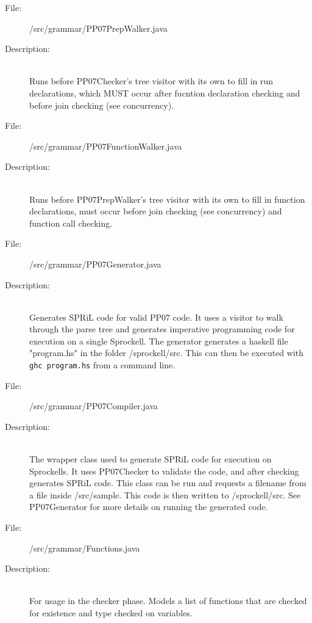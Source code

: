 \documentclass[10pt,a4paper]{report}
\begin{document}
\begin{description}
	\item[File:] /src/grammar/PP07PrepWalker.java
	\item[Description:] \hfill \\
		Runs before PP07Checker's tree visitor with its own to fill in run declarations, which MUST occur after fucntion declaration checking and before join checking (see concurrency). 
\end{description}

\begin{description}
	\item[File:] /src/grammar/PP07FunctionWalker.java
	\item[Description:] \hfill \\
		Runs before PP07PrepWalker's tree visitor with its own to fill in function declarations, must occur before join checking (see concurrency) and function call checking. 
\end{description}

\begin{description}
	\item[File:] /src/grammar/PP07Generator.java
	\item[Description:] \hfill \\
		Generates SPRiL code for valid PP07 code. It uses a visitor to walk through the parse tree and generates imperative programming code for execution on a single Sprockell. The generator generates a haskell file "program.hs" in the folder /sprockell/src. This can then be executed with \texttt{ghc program.hs} from a command line.
\end{description}

\begin{description}
	\item[File:] /src/grammar/PP07Compiler.java
	\item[Description:] \hfill \\
		The wrapper class used to generate SPRiL code for execution on Sprockells. It uses PP07Checker to validate the code, and after checking generates SPRiL code. This class can be run and requests a filename from a file inside /src/sample. This code is then written to /sprockell/src. See PP07Generator for more details on running the generated code. 
\end{description}

\begin{description}
	\item[File:] /src/grammar/Functions.java
	\item[Description:] \hfill \\
		For usage in the checker phase. Models a list of functions that are checked for existence and type checked on variables.  
\end{description}
\end{document}
